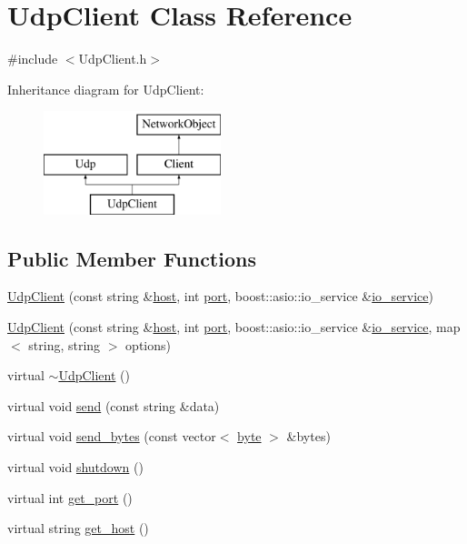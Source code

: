 \hypertarget{classUdpClient}{
\section{UdpClient Class Reference}
\label{classUdpClient}
}


{\ttfamily \#include $<$UdpClient.h$>$}

Inheritance diagram for UdpClient:\begin{figure}[H]
\begin{center}
\leavevmode
\includegraphics[height=3.000000cm]{classUdpClient}
\end{center}
\end{figure}
\subsection*{Public Member Functions}
\begin{DoxyCompactItemize}
\item 
\hyperlink{classUdpClient_a3939a516b0c78c572bb6318be26039c8}{UdpClient} (const string \&\hyperlink{classUdp_a798fd48815d9d97045e8e6a3a290d301}{host}, int \hyperlink{classUdp_af69ea781b31a1fa62e5d3012b6288dc8}{port}, boost::asio::io\_\-service \&\hyperlink{classUdp_a7e143116ab3a0f478c8461ca04af782b}{io\_\-service})
\item 
\hyperlink{classUdpClient_a3a44547ebe0cbc3b85e0163b32767338}{UdpClient} (const string \&\hyperlink{classUdp_a798fd48815d9d97045e8e6a3a290d301}{host}, int \hyperlink{classUdp_af69ea781b31a1fa62e5d3012b6288dc8}{port}, boost::asio::io\_\-service \&\hyperlink{classUdp_a7e143116ab3a0f478c8461ca04af782b}{io\_\-service}, map$<$ string, string $>$ options)
\item 
virtual \hyperlink{classUdpClient_a9e69046802da8ea9e0bf3da874c49e47}{$\sim$UdpClient} ()
\item 
virtual void \hyperlink{classUdpClient_a86e50f32bbb7aaf657ea5cc91cbc99d2}{send} (const string \&data)
\item 
virtual void \hyperlink{classUdpClient_ad55f42a3c5cb3698b49975c8a065079e}{send\_\-bytes} (const vector$<$ \hyperlink{Event_8h_ae0aa21f6bcb621fe36c2c962aa0452fe}{byte} $>$ \&bytes)
\item 
virtual void \hyperlink{classUdpClient_a64b6b51f6a2316f7235381409f9cc327}{shutdown} ()
\item 
virtual int \hyperlink{classUdpClient_aaa19f0f767306e0e974782dd700c5c49}{get\_\-port} ()
\item 
virtual string \hyperlink{classUdpClient_ac18bd8d30497c82dfe1a63a464d01e00}{get\_\-host} ()
\end{DoxyCompactItemize}
